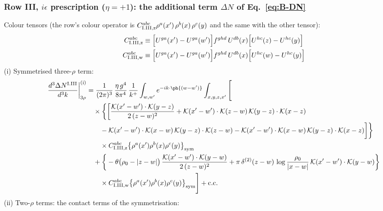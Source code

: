 \subsubsection*{Row III, $i\epsilon$ prescription ($\eta=+1$): the additional term $\Delta N$ of Eq.~\eqref{eq:B-DN}}
Colour tensors (the row's colour operator is $C^{abc}_{{\rm I.III,z}}\rho^{a}(x')\,\rho^{b}(x)\,\rho^{c}(y)$ and the same with the other tensor):
\begin{align}
C^{abc}_{{\rm I.III,z}}&\equiv \Big[U^{ga}(x')-U^{ga}(w')\Big]f^{ghd}\,U^{db}(x)\Big[U^{hc}(z)-U^{hc}(y)\Big]\notag\\
C^{abc}_{{\rm I.III,w}}&\equiv \Big[U^{ga}(x')-U^{ga}(w')\Big]f^{ghd}\,U^{db}(x)\Big[U^{hc}(w)-U^{hc}(y)\Big]\notag
\end{align}
(i) Symmetrised three-$\rho$ term:
\begin{align}
\frac{d^{3}\Delta N^{\rm I.III}}{d^{3}k}\bigg|^{\rm (i)}_{3\rho}&=\frac{1}{(2\pi)^{3}}\,\frac{\eta\,g^{4}}{8\pi^{4}}\,\frac{1}{k^{+}}\int_{w,w'}e^{-ik\cdot\ph{(w-w')}}\int_{x,y,z,x'}\Bigg[\notag\\
&\quad\times\bigg\{\bigg[\frac{\mathcal{K}(x'-w')\cdot\mathcal{K}(y-z)}{2\,(z-w)^{2}}+\mathcal{K}(x'-w')\cdot\mathcal{K}(z-w)\,\mathcal{K}(y-z)\cdot\mathcal{K}(x-z)\notag\\
&\qquad-\mathcal{K}(x'-w')\cdot\mathcal{K}(x-w)\,\mathcal{K}(y-z)\cdot\mathcal{K}(z-w)-\mathcal{K}(x'-w')\cdot\mathcal{K}(x-w)\,\mathcal{K}(y-z)\cdot\mathcal{K}(x-z)\bigg]\bigg\}\notag\\
&\qquad\times C^{abc}_{{\rm I.III,z}}\big\{\rho^{a}(x')\rho^{b}(x)\rho^{c}(y)\big\}_{\rm sym}\notag\\
&\quad+\bigg\{-\theta\big(\rho_{0}-|z-w|\big)\,\frac{\mathcal{K}(x'-w')\cdot\mathcal{K}(y-w)}{2\,(z-w)^{2}}+\pi\,\delta^{(2)}(z-w)\,\log\frac{\rho_{0}}{|x-w|}\,\mathcal{K}(x'-w')\cdot\mathcal{K}(y-w)\bigg\}\notag\\
&\qquad\times C^{abc}_{{\rm I.III,w}}\big\{\rho^{a}(x')\rho^{b}(x)\rho^{c}(y)\big\}_{\rm sym}\Bigg]+{\rm c.c.}\label{eq:D-I.IIIdN-3}
\end{align}
(ii) Two-$\rho$ terms: the contact terms of the symmetrisation:
